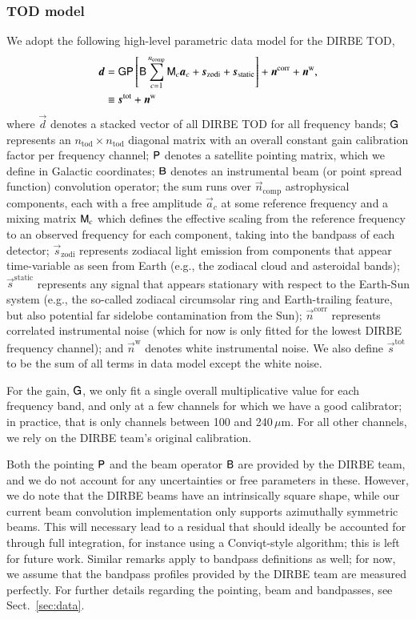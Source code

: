 \documentclass{aa}
\newcommand{\dv}[0]{\vec{d}}
\newcommand{\B}[0]{\tens{B}}
\newcommand{\G}[0]{\tens{G}}
\newcommand{\n}[0]{\vec{n}}
\newcommand{\s}[0]{\vec{s}}
\renewcommand{\a}[0]{\vec{a}}
\newcommand{\M}[0]{\tens{M}}
\renewcommand{\P}[0]{\tens{P}}
\begin{document}
\subsubsection{TOD model}

We adopt the following high-level parametric data model for the DIRBE
TOD,
\begin{align}
	\label{eq:model}
	\dv &=\G\P\left[\B\sum_{c=1}^{n_{\mathrm{comp}}}\M_c\a_c+\s_{\mathrm{zodi}} +
          \s_{\mathrm{static}}\right] + \n^\mathrm{corr} + \n^\mathrm w,\\
        &\equiv \s^{\mathrm{tot}} + \n^{\mathrm{w}}
\end{align}
where $\dv$ denotes a stacked vector of all DIRBE TOD for all
frequency bands; $\G$ represents an $n_{\mathrm{tod}}\times
n_{\mathrm{tod}}$ diagonal matrix with an overall constant gain
calibration factor per frequency channel; $\P$ denotes a satellite
pointing matrix, which we define in Galactic coordinates; $\B$ denotes
an instrumental beam (or point spread function) convolution operator;
the sum runs over $\n_{\mathrm{comp}}$ astrophysical components, each
with a free amplitude $\a_c$ at some reference frequency and a mixing
matrix $\M_c$ which defines the effective scaling from the reference
frequency to an observed frequency for each component, taking into the
bandpass of each detector; $\s_{\mathrm{zodi}}$ represents zodiacal
light emission from components that appear time-variable as seen from
Earth (e.g., the zodiacal cloud and asteroidal bands);
$\s^{\mathrm{static}}$ represents any signal that appears stationary
with respect to the Earth-Sun system (e.g., the so-called zodiacal
circumsolar ring and Earth-trailing feature, but also potential far
sidelobe contamination from the Sun); $\n^{\mathrm{corr}}$ represents
correlated instrumental noise (which for now is only fitted for the
lowest DIRBE frequency channel); and $\n^{\mathrm{w}}$ denotes white
instrumental noise. We also define $\s^{\mathrm{tot}}$ to be the sum
of all terms in data model except the white noise.

For the gain, $\G$, we only fit a single overall multiplicative value
for each frequency band, and only at a few channels for which we have
a good calibrator; in practice, that is only channels between 100 and
240\,$\mu$m. For all other channels, we rely on the DIRBE team's
original calibration.

Both the pointing $\P$ and the beam operator $\B$ are provided by the
DIRBE team, and we do not account for any uncertainties or free
parameters in these. However, we do note that the DIRBE beams have an
intrinsically square shape, while our current beam convolution
implementation only supports azimuthally symmetric beams. This will
necessary lead to a residual that should ideally be accounted for
through full integration, for instance using a Conviqt-style
algorithm; this is left for future work. Similar remarks apply to
bandpass definitions as well; for now, we assume that the bandpass
profiles provided by the DIRBE team are measured perfectly. For
further details regarding the pointing, beam and bandpasses, see
Sect.~\ref{sec:data}.
\end{document}
